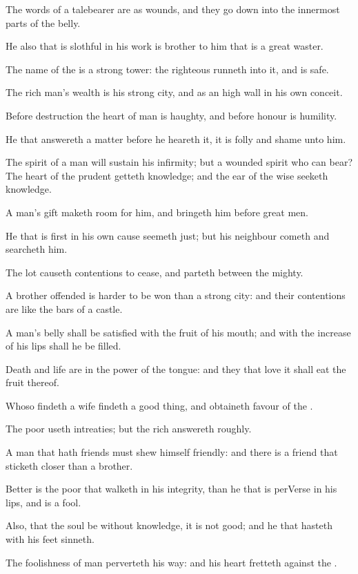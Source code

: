\Verse The words of a talebearer are as wounds, and they go down into the innermost parts of the belly.

\Verse He also that is slothful in his work is brother to him that is a great waster.

\Verse The name of the \LORD is a strong tower: the righteous runneth into it, and is safe.

\Verse The rich man's wealth is his strong city, and as an high wall in his own conceit.

\Verse Before destruction the heart of man is haughty, and before honour is humility.

\Verse He that answereth a matter before he heareth it, it is folly and shame unto him.

\Verse The spirit of a man will sustain his infirmity; but a wounded spirit who can bear?  \Verse The heart of the prudent getteth knowledge; and the ear of the wise seeketh knowledge.

\Verse A man's gift maketh room for him, and bringeth him before great men.

\Verse He that is first in his own cause seemeth just; but his neighbour cometh and searcheth him.

\Verse The lot causeth contentions to cease, and parteth between the mighty.

\Verse A brother offended is harder to be won than a strong city: and their contentions are like the bars of a castle.

\Verse A man's belly shall be satisfied with the fruit of his mouth; and with the increase of his lips shall he be filled.

\Verse Death and life are in the power of the tongue: and they that love it shall eat the fruit thereof.

\Verse Whoso findeth a wife findeth a good thing, and obtaineth favour of the \LORD.

\Verse The poor useth intreaties; but the rich answereth roughly.

\Verse A man that hath friends must shew himself friendly: and there is a friend that sticketh closer than a brother.


\Chapter
\Verse Better is the poor that walketh in his integrity, than he that is perVerse in his lips, and is a fool.

\Verse Also, that the soul be without knowledge, it is not good; and he that hasteth with his feet sinneth.

\Verse The foolishness of man perverteth his way: and his heart fretteth against the \LORD.

